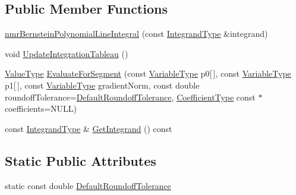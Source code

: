 \subsection*{Public Member Functions}
\begin{DoxyCompactItemize}
\item 
\hyperlink{classnmr_bernstein_polynomial_line_integral_a792ce0eb930e6e952b0d6db4374b4854}{nmr\+Bernstein\+Polynomial\+Line\+Integral} (const \hyperlink{classnmr_bernstein_polynomial_line_integral_a5c7945eacbf7d3d225de9d11bbac138c}{Integrand\+Type} \&integrand)
\item 
void \hyperlink{classnmr_bernstein_polynomial_line_integral_ace2bdff4c8e8c70d7e5a73284225ae49}{Update\+Integration\+Tableau} ()
\item 
\hyperlink{classnmr_bernstein_polynomial_line_integral_ab1d3f80540e0791f359e53b3ef074a86}{Value\+Type} \hyperlink{classnmr_bernstein_polynomial_line_integral_aa0715104b8922688ed16042b410f7d82}{Evaluate\+For\+Segment} (const \hyperlink{classnmr_bernstein_polynomial_line_integral_a229f7cb4c93c33c1b2a3de23d4f3460b}{Variable\+Type} p0\mbox{[}$\,$\mbox{]}, const \hyperlink{classnmr_bernstein_polynomial_line_integral_a229f7cb4c93c33c1b2a3de23d4f3460b}{Variable\+Type} p1\mbox{[}$\,$\mbox{]}, const \hyperlink{classnmr_bernstein_polynomial_line_integral_a229f7cb4c93c33c1b2a3de23d4f3460b}{Variable\+Type} gradient\+Norm, const double roundoff\+Tolerance=\hyperlink{classnmr_bernstein_polynomial_line_integral_acd99dd062ecb011d518908d73b5f6c80}{Default\+Roundoff\+Tolerance}, \hyperlink{classnmr_bernstein_polynomial_line_integral_a0dc7480d6f60af6d3d8da6e32444edf7}{Coefficient\+Type} const $\ast$coefficients=N\+U\+L\+L)
\item 
const \hyperlink{classnmr_bernstein_polynomial_line_integral_a5c7945eacbf7d3d225de9d11bbac138c}{Integrand\+Type} \& \hyperlink{classnmr_bernstein_polynomial_line_integral_a77d948c760c2886f75ac0b9ad5855e8d}{Get\+Integrand} () const 
\end{DoxyCompactItemize}
\subsection*{Static Public Attributes}
\begin{DoxyCompactItemize}
\item 
static const double \hyperlink{classnmr_bernstein_polynomial_line_integral_acd99dd062ecb011d518908d73b5f6c80}{Default\+Roundoff\+Tolerance}
\end{DoxyCompactItemize}
